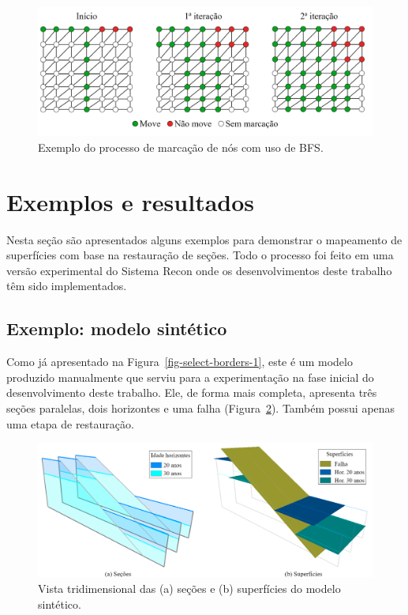 \begin{figure} [h]
  \begin{center}
    \includegraphics[width=\textwidth]{images/fig-bfs-in-mesh}
    \caption{Exemplo do processo de marcação de nós com uso de BFS.}\label{fig-bfs-in-mesh}
  \end{center}
\end{figure}

\section{Exemplos e resultados}

Nesta seção são apresentados alguns exemplos para demonstrar o mapeamento de superfícies com base na restauração de seções. Todo o processo foi feito em uma versão experimental do Sistema Recon onde os desenvolvimentos deste trabalho têm sido implementados.

\subsection{Exemplo: modelo sintético}

Como já apresentado na Figura~\ref{fig-select-borders-1}, este é um modelo produzido manualmente que serviu para a experimentação na fase inicial do desenvolvimento deste trabalho. Ele, de forma mais completa, apresenta três seções paralelas, dois horizontes e uma falha (Figura~\ref{fig-example-1-1}). Também possui apenas uma etapa de restauração. 

\begin{figure} [H]
  \begin{center}
    \includegraphics[width=\textwidth]{images/fig-example-1-1}
    \caption{Vista tridimensional das (a) seções e (b) superfícies do modelo sintético.}\label{fig-example-1-1}
  \end{center}
\end{figure}

